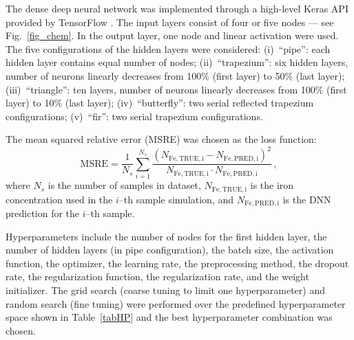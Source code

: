 \documentclass[num-refs]{wiley-article} %
\begin{document}
The dense deep neural network was implemented through a high-level Keras API provided by TensorFlow \cite{Keras}.
The input layers consist of four or five nodes --- see Fig.~\ref{fig_chem}.
In the output layer, one node and linear activation were used.
The five configurations of the hidden layers  were considered:
(i)~``pipe'': each hidden layer contains equal number of nodes;
(ii)~``trapezium'': six hidden layers, number of neurons linearly decreases from 100\% (first layer) to 50\% (last layer);
(iii)~``triangle'': ten layers, number of neurons linearly decreases from 100\% (first layer) to 10\% (last layer);
(iv)~``butterfly'': two serial reflected trapezium configurations;
(v)~``fir'': two serial trapezium configurations.


The mean squared relative error (MSRE) was chosen as the loss function:
\begin{equation}
\label{eqMSRE}
    \mathrm{MSRE}=\frac{1}{N_s}\sum_{i=1}^{N_s}\frac{(N_\mathrm{Fe,TRUE,i}-N_\mathrm{Fe,PRED,i})^2}{N_\mathrm{Fe,TRUE,i}\cdot N_\mathrm{Fe,PRED,i}}\,,
\end{equation}
where
$N_s$ is the number of samples in dataset,
$N_\mathrm{Fe,TRUE,i}$ is the iron concentration used in the $i$--th sample simulation, and
$N_\mathrm{Fe,PRED,i}$ is the DNN prediction for the $i$--th sample.

Hyperparameters include the number of nodes for the first hidden layer,
the number of hidden layers (in pipe configuration),
the batch size,
the activation function,
the optimizer,
the learning rate,
the preprocessing method,
the dropout rate,
the regularization function,
the regularization rate,
and the weight initializer.
The grid search (coarse tuning to limit one hyperparameter) and random search (fine tuning) were performed over the predefined hyperparameter space
shown in Table~\ref{tabHP} and the best hyperparameter combination was chosen.
\end{document}
